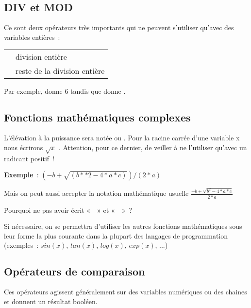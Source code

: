 		\subsection{DIV et MOD}
	
			Ce sont deux opérateurs très importants qui ne peuvent s’utiliser
			qu’avec des variables entières~:
	
			\begin{center}
			\tablehead{}
			\begin{supertabular}{m{1cm}|m{12cm}}
			\raggedleft  {} & division entière\\
			\raggedleft  {} & reste de la division entière\\
			\end{supertabular}
			\end{center}
	
			Par exemple,  donne 6 tandis que
			 donne .
	
		\subsection{Fonctions mathématiques complexes}
	
			L’élévation à la puissance sera notée \textstyleCodeInsr{**} ou
			\textstyleCodeInsr{\^{}} . Pour la racine carrée d’une variable x nous
			écrirons  $\sqrt{x}$ \textit{.} Attention, pour ce dernier, de veiller
			à ne l’utiliser qu’avec un radicant positif~!
	
			\textbf{Exemple}~: 
			$(-b+\sqrt{(b\ast \ast 2-4\ast a\ast c)})/(2\ast a)$
			
			Mais on peut aussi accepter la notation mathématique usuelle
			$\frac{-b+\sqrt{b^{2}-4\ast a\ast c}}{2\ast a}$ 
	
			Pourquoi ne pas avoir écrit «~~» et
			«~~»~?
	
			Si nécessaire, on se permettra d’utiliser les autres
			fonctions mathématiques sous leur forme la plus courante dans la
			plupart des langages de programmation (exemples~:
			$sin(x)$, $tan(x)$, $log(x)$, $exp(x)$, ...)
			
		
		\subsection{Opérateurs de comparaison}
	
			Ces opérateurs agissent généralement sur des variables numériques ou des
			chaines et donnent un résultat booléen.
	

